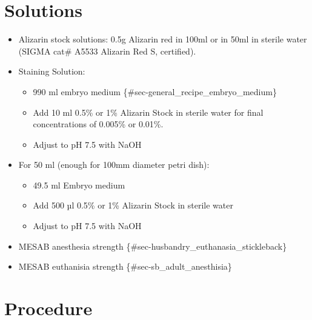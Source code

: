 \documentclass[
  letterpaper,
  DIV=11,
  numbers=noendperiod]{scrreprt}
\providecommand{\tightlist}{%
  \setlength{\itemsep}{0pt}\setlength{\parskip}{0pt}}\usepackage{longtable,booktabs,array}
\begin{document}
\hypertarget{solutions-46}{%
\section{Solutions}\label{solutions-46}}

\begin{itemize}
\tightlist
\item
  Alizarin stock solutions: 0.5g Alizarin red in 100ml or in 50ml in
  sterile water (SIGMA cat\# A5533 Alizarin Red S, certified).
\item
  Staining Solution:

  \begin{itemize}
  \tightlist
  \item
    990 ml embryo medium \{\#sec-general\_recipe\_embryo\_medium\}
  \item
    Add 10 ml 0.5\% or 1\% Alizarin Stock in sterile water for final
    concentrations of 0.005\% or 0.01\%.
  \item
    Adjust to pH 7.5 with NaOH
  \end{itemize}
\item
  For 50 ml (enough for 100mm diameter petri dish):

  \begin{itemize}
  \tightlist
  \item
    49.5 ml Embryo medium
  \item
    Add 500 µl 0.5\% or 1\% Alizarin Stock in sterile water
  \item
    Adjust to pH 7.5 with NaOH
  \end{itemize}
\item
  MESAB anesthesia strength \{\#sec-husbandry\_euthanasia\_stickleback\}
\item
  MESAB euthanisia strength \{\#sec-sb\_adult\_anesthisia\}
\end{itemize}

\hypertarget{procedure-49}{%
\section{Procedure}\label{procedure-49}}
\end{document}

